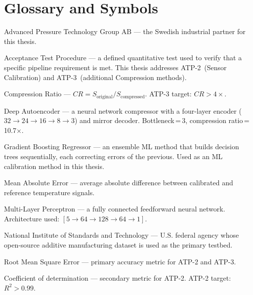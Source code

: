 \section*{Glossary and Symbols}
\vspace{-2ex}\titlerule\vspace{4ex}

\begin{description}[leftmargin=2em, itemsep=4pt]
\item[AP\&T] Advanced Pressure Technology Group AB --- the Swedish industrial partner for this thesis.

\item[ATP] Acceptance Test Procedure --- a defined quantitative test used to verify that a specific pipeline requirement is met. This thesis addresses ATP-2~(Sensor Calibration) and ATP-3~(additional Compression methods).

\item[CR] Compression Ratio --- $CR = S_{\text{original}} / S_{\text{compressed}}$. ATP-3 target: $CR > 4\times$.

\item[Deep AE] Deep Autoencoder --- a neural network compressor with a four-layer encoder ($32\!\rightarrow\!24\!\rightarrow\!16\!\rightarrow\!8\!\rightarrow\!3$) and mirror decoder. Bottleneck\,=\,3, compression ratio\,=\,10.7$\times$.

\item[GBR] Gradient Boosting Regressor --- an ensemble ML method that builds decision trees sequentially, each correcting errors of the previous. Used as an ML calibration method in this thesis.

\item[MAE] Mean Absolute Error --- average absolute difference between calibrated and reference temperature signals.

\item[MLP] Multi-Layer Perceptron --- a fully connected feedforward neural network. Architecture used: $[5\!\rightarrow\!64\!\rightarrow\!128\!\rightarrow\!64\!\rightarrow\!1]$.

\item[NIST] National Institute of Standards and Technology --- U.S. federal agency whose open-source additive manufacturing dataset is used as the primary testbed.

\item[RMSE] Root Mean Square Error --- primary accuracy metric for ATP-2 and ATP-3.

\item[$R^2$] Coefficient of determination --- secondary metric for ATP-2. ATP-2 target: $R^2 > 0.99$.


\end{description}
